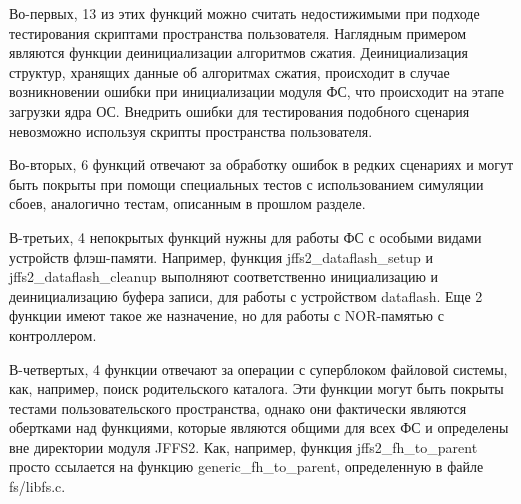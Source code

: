 Во-первых, 13 из этих функций можно считать недостижимыми при подходе тестирования скриптами пространства пользователя. Наглядным примером являются функции деинициализации алгоритмов сжатия. Деинициализация структур, хранящих данные об алгоритмах сжатия, происходит в случае возникновении ошибки при инициализации модуля ФС, что происходит на этапе загрузки ядра ОС. Внедрить ошибки для тестирования подобного сценария невозможно используя скрипты пространства пользователя.

Во-вторых, 6 функций отвечают за обработку ошибок в редких сценариях и могут быть покрыты при помощи специальных тестов с использованием симуляции сбоев, аналогично тестам, описанным в прошлом разделе.

В-третьих, 4 непокрытых функций нужны для работы ФС с особыми видами устройств флэш-памяти. Например, функция jffs2\_dataflash\_setup и jffs2\_dataflash\_cleanup выполняют соответственно инициализацию и деинициализацию буфера записи, для работы с устройством dataflash. Еще 2 функции имеют такое же назначение, но для работы с NOR-памятью с контроллером.

В-четвертых, 4 функции отвечают за операции с суперблоком файловой системы, как, например, поиск родительского каталога. Эти функции могут быть покрыты тестами пользовательского пространства, однако они фактически являются обертками над функциями, которые являются общими для всех ФС и определены вне директории модуля JFFS2. Как, например, функция jffs2\_fh\_to\_parent просто ссылается на функцию generic\_fh\_to\_parent, определенную в файле fs/libfs.c.

\newpage
